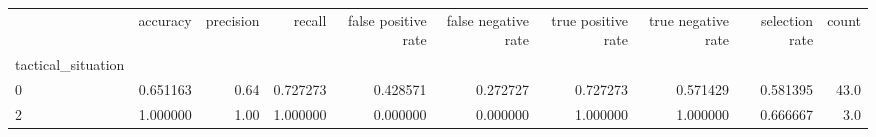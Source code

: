 \begin{tabular}{lrrrrrrrrr}
\toprule
{} &  accuracy &  precision &    recall &  false positive rate &  false negative rate &  true positive rate &  true negative rate &  selection rate &  count \\
tactical\_situation &           &            &           &                      &                      &                     &                     &                 &        \\
\midrule
0                  &  0.651163 &       0.64 &  0.727273 &             0.428571 &             0.272727 &            0.727273 &            0.571429 &        0.581395 &   43.0 \\
2                  &  1.000000 &       1.00 &  1.000000 &             0.000000 &             0.000000 &            1.000000 &            1.000000 &        0.666667 &    3.0 \\
\bottomrule
\end{tabular}
